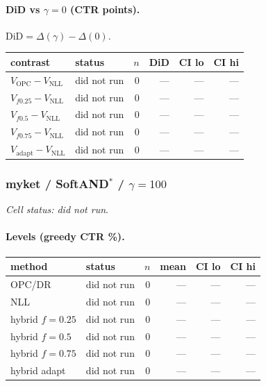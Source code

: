 \documentclass[10pt,a4paper]{article}
\begin{document}
\paragraph{DiD vs $\gamma=0$ (CTR points).} $\mathrm{DiD}=\Delta(\gamma)-\Delta(0)$.
{\centering\small\begin{tabular}{llrrrr}
\toprule contrast & status & $n$ & DiD & CI lo & CI hi \\
\midrule
$V_{\mathrm{OPC}}-V_{\mathrm{NLL}}$ & did not run & 0 & --- & --- & --- \\
$V_{f0.25}-V_{\mathrm{NLL}}$ & did not run & 0 & --- & --- & --- \\
$V_{f0.5}-V_{\mathrm{NLL}}$ & did not run & 0 & --- & --- & --- \\
$V_{f0.75}-V_{\mathrm{NLL}}$ & did not run & 0 & --- & --- & --- \\
$V_{\mathrm{adapt}}-V_{\mathrm{NLL}}$ & did not run & 0 & --- & --- & --- \\
\bottomrule\end{tabular}\par}
\bigskip
\subsubsection{myket / SoftAND$^*$ / $\gamma=100$}
\emph{Cell status: did not run}.
\paragraph{Levels (greedy CTR \%).}
{\centering\small\begin{tabular}{llrrrr}
\toprule method & status & $n$ & mean & CI lo & CI hi \\
\midrule
OPC/DR & did not run & 0 & --- & --- & --- \\
NLL & did not run & 0 & --- & --- & --- \\
hybrid $f{=}0.25$ & did not run & 0 & --- & --- & --- \\
hybrid $f{=}0.5$ & did not run & 0 & --- & --- & --- \\
hybrid $f{=}0.75$ & did not run & 0 & --- & --- & --- \\
hybrid adapt & did not run & 0 & --- & --- & --- \\
\bottomrule\end{tabular}\par}
\end{document}
